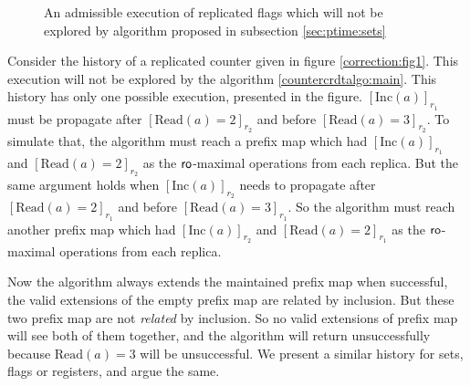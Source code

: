 \begin{figure}
\begin{minipage}{\textwidth}
        \caption{An admissible execution of replicated flags which will not be explored by algorithm proposed in subsection \ref{sec:ptime:sets}}
        \label{correction:fig2}
    \end{minipage}
    \end{figure}

Consider the history of a replicated counter given in figure \ref{correction:fig1}. This execution will not be explored by the algorithm \ref{countercrdtalgo:main}. This history has only one possible execution, presented in the figure. $[\mathrm{Inc}(a)]_{r_1}$ must be propagate after $[\mathrm{Read}(a) = 2]_{r_2}$ and before $[\mathrm{Read}(a) = 3]_{r_2}$. To simulate that, the algorithm must reach a prefix map which had $[\mathrm{Inc}(a)]_{r_1}$ and $[\mathrm{Read}(a) = 2]_{r_2}$ as the $\mathsf{ro}$-maximal operations from each replica. But the same argument holds when $[\mathrm{Inc}(a)]_{r_2}$ needs to propagate after $[\mathrm{Read}(a) = 2]_{r_1}$ and before $[\mathrm{Read}(a) = 3]_{r_1}$. So the algorithm must reach another prefix map which had $[\mathrm{Inc}(a)]_{r_2}$ and $[\mathrm{Read}(a) = 2]_{r_1}$ as the $\mathsf{ro}$-maximal operations from each replica.

Now the algorithm always extends the maintained prefix map \ie when successful, the valid extensions of the empty prefix map are related by inclusion. But these two prefix map are not \emph{related} by inclusion. So no valid extensions of prefix map will see both of them together, and the algorithm will return unsuccessfully because $\mathrm{Read}(a) = 3$ will be unsuccessful. We present a similar history for sets, flags or registers, and argue the same.

